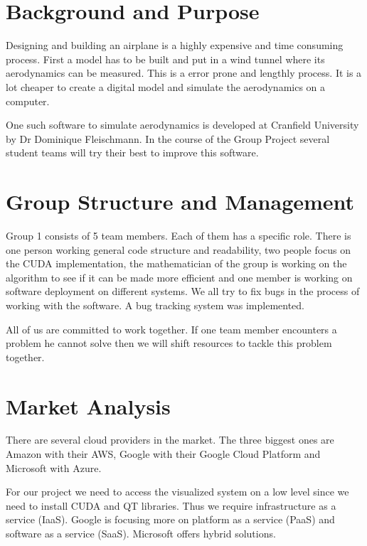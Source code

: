 \documentclass[11pt]{article}
\begin{document}
\section{Background and Purpose}
Designing and building an airplane is a highly expensive and time consuming process. First a model has to be built and put in a wind tunnel where its aerodynamics can be measured. This is a error prone and lengthly process. It is a lot cheaper to create a digital model and simulate the aerodynamics on a computer.

One such software to simulate aerodynamics is developed at Cranfield University by Dr Dominique Fleischmann. In the course of the Group Project several student teams will try their best to improve this software.




\section{Group Structure and Management}

Group 1 consists of 5 team members. Each of them has a specific role. There is one person working general code structure and readability, two people focus on the CUDA implementation, the mathematician of the group is working on the algorithm to see if it can be made more efficient and one member is working on software deployment on different systems. We all try to fix bugs in the process of working with the software. A bug tracking system was implemented.

All of us are committed to work together. If one team member encounters a problem he cannot solve then we will shift resources to tackle this problem together. 



\section{Market Analysis}

There are several cloud providers in the market. The three biggest ones are Amazon with their AWS, Google with their Google Cloud Platform and Microsoft with Azure.

For our project we need to access the visualized system on a low level since we need to install CUDA and QT libraries. Thus we require infrastructure as a service (IaaS). Google is focusing more on platform as a service (PaaS) and software as a service (SaaS). Microsoft offers hybrid solutions. 
\end{document}
